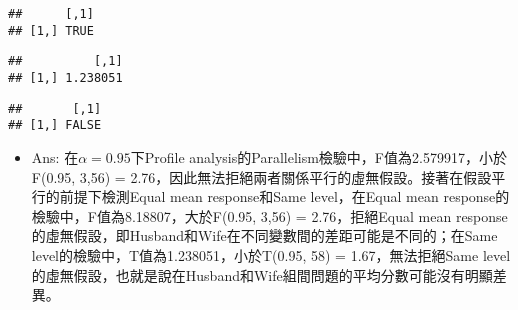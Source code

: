 \documentclass[]{article}
\newenvironment{Shaded}{\begin{snugshade}}{\end{snugshade}}
\newcommand{\CommentTok}[1]{\textcolor[rgb]{0.56,0.35,0.01}{\textit{#1}}}
\newcommand{\DataTypeTok}[1]{\textcolor[rgb]{0.13,0.29,0.53}{#1}}
\newcommand{\DecValTok}[1]{\textcolor[rgb]{0.00,0.00,0.81}{#1}}
\newcommand{\FloatTok}[1]{\textcolor[rgb]{0.00,0.00,0.81}{#1}}
\newcommand{\KeywordTok}[1]{\textcolor[rgb]{0.13,0.29,0.53}{\textbf{#1}}}
\newcommand{\NormalTok}[1]{#1}
\newcommand{\OperatorTok}[1]{\textcolor[rgb]{0.81,0.36,0.00}{\textbf{#1}}}
\newcommand{\StringTok}[1]{\textcolor[rgb]{0.31,0.60,0.02}{#1}}
\providecommand{\tightlist}{%
  \setlength{\itemsep}{0pt}\setlength{\parskip}{0pt}}
\begin{document}
\begin{verbatim}
##      [,1]
## [1,] TRUE
\end{verbatim}

\begin{Shaded}
\end{Shaded}

\begin{verbatim}
##          [,1]
## [1,] 1.238051
\end{verbatim}

\begin{Shaded}
\end{Shaded}

\begin{verbatim}
##       [,1]
## [1,] FALSE
\end{verbatim}

\begin{itemize}
\tightlist
\item
  Ans: 在\(\alpha = 0.95下\)Profile
  analysis的Parallelism檢驗中，F值為2.579917，小於F(0.95, 3,56) =
  2.76，因此無法拒絕兩者關係平行的虛無假設。接著在假設平行的前提下檢測Equal
  mean response和Same level，在Equal mean
  response的檢驗中，F值為8.18807，大於F(0.95, 3,56) = 2.76，拒絕Equal
  mean
  response的虛無假設，即Husband和Wife在不同變數間的差距可能是不同的；在Same
  level的檢驗中，T值為1.238051，小於T(0.95, 58) = 1.67，無法拒絕Same
  level的虛無假設，也就是說在Husband和Wife組間問題的平均分數可能沒有明顯差異。
\end{itemize}
\end{document}
